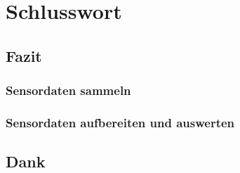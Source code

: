 
\chapter{Schlusswort} \label{chap:Finish}

\section{Fazit}

\subsection{Sensordaten sammeln}


\subsection{Sensordaten aufbereiten und auswerten}



\section{Dank}
